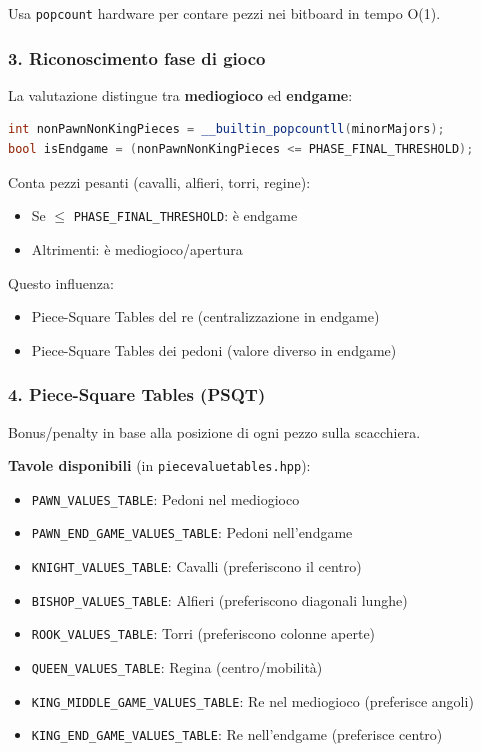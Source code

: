 Usa \texttt{popcount} hardware per contare pezzi nei bitboard in tempo O(1).

\subsubsection{3. Riconoscimento fase di gioco}

La valutazione distingue tra \textbf{mediogioco} ed \textbf{endgame}:

\begin{lstlisting}[language=C++]
int nonPawnNonKingPieces = __builtin_popcountll(minorMajors);
bool isEndgame = (nonPawnNonKingPieces <= PHASE_FINAL_THRESHOLD);
\end{lstlisting}

Conta pezzi pesanti (cavalli, alfieri, torri, regine):
\begin{itemize}
\item Se $\leq$ \texttt{PHASE\_FINAL\_THRESHOLD}: è endgame
\item Altrimenti: è mediogioco/apertura
\end{itemize}

Questo influenza:
\begin{itemize}
\item Piece-Square Tables del re (centralizzazione in endgame)
\item Piece-Square Tables dei pedoni (valore diverso in endgame)
\end{itemize}

\subsubsection{4. Piece-Square Tables (PSQT)}

Bonus/penalty in base alla posizione di ogni pezzo sulla scacchiera.

\textbf{Tavole disponibili} (in \texttt{piecevaluetables.hpp}):
\begin{itemize}
\item \texttt{PAWN\_VALUES\_TABLE}: Pedoni nel mediogioco
\item \texttt{PAWN\_END\_GAME\_VALUES\_TABLE}: Pedoni nell'endgame
\item \texttt{KNIGHT\_VALUES\_TABLE}: Cavalli (preferiscono il centro)
\item \texttt{BISHOP\_VALUES\_TABLE}: Alfieri (preferiscono diagonali lunghe)
\item \texttt{ROOK\_VALUES\_TABLE}: Torri (preferiscono colonne aperte)
\item \texttt{QUEEN\_VALUES\_TABLE}: Regina (centro/mobilità)
\item \texttt{KING\_MIDDLE\_GAME\_VALUES\_TABLE}: Re nel mediogioco (preferisce angoli)
\item \texttt{KING\_END\_GAME\_VALUES\_TABLE}: Re nell'endgame (preferisce centro)
\end{itemize}

